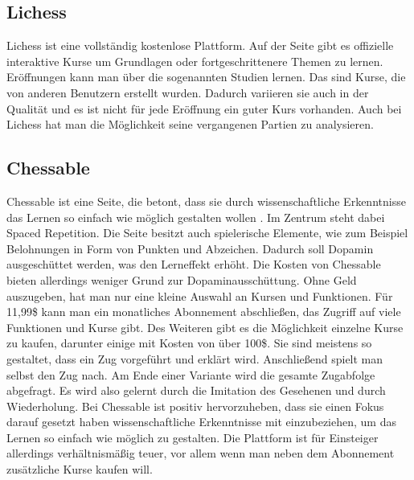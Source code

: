 \subsection{Lichess}
Lichess ist eine vollständig kostenlose Plattform. Auf der Seite gibt es offizielle interaktive Kurse um Grundlagen oder fortgeschrittenere Themen zu lernen. Eröffnungen kann man über die sogenannten Studien lernen. Das sind Kurse, die von anderen Benutzern erstellt wurden. Dadurch variieren sie auch in der Qualität und es ist nicht für jede Eröffnung ein guter Kurs vorhanden. Auch bei Lichess hat man die Möglichkeit seine vergangenen Partien zu analysieren.

\subsection{Chessable}
Chessable ist eine Seite, die betont, dass sie durch wissenschaftliche Erkenntnisse das Lernen so einfach wie möglich gestalten wollen \cite{prof_barry_hymer_science_nodate}. Im Zentrum steht dabei Spaced Repetition. Die Seite besitzt auch spielerische Elemente, wie zum Beispiel Belohnungen in Form von Punkten und Abzeichen.
Dadurch soll Dopamin ausgeschüttet werden, was den Lerneffekt erhöht.
Die Kosten von Chessable bieten allerdings weniger Grund zur Dopaminausschüttung.
Ohne Geld auszugeben, hat man nur eine kleine Auswahl an Kursen und Funktionen.
Für 11,99\$ kann man ein monatliches Abonnement abschließen, das Zugriff auf viele Funktionen und Kurse gibt. Des Weiteren gibt es die Möglichkeit einzelne Kurse zu kaufen, darunter einige mit Kosten von über 100\$.
Sie sind meistens so gestaltet, dass ein Zug vorgeführt und erklärt wird. Anschließend spielt man selbst den Zug nach. Am Ende einer Variante wird die gesamte Zugabfolge abgefragt. Es wird also gelernt durch die Imitation des Gesehenen und durch Wiederholung.
Bei Chessable ist positiv hervorzuheben, dass sie einen Fokus darauf gesetzt haben wissenschaftliche Erkenntnisse mit einzubeziehen, um das Lernen so einfach wie möglich zu gestalten. Die Plattform ist für Einsteiger allerdings verhältnismäßig teuer, vor allem wenn man neben dem Abonnement zusätzliche Kurse kaufen will.

